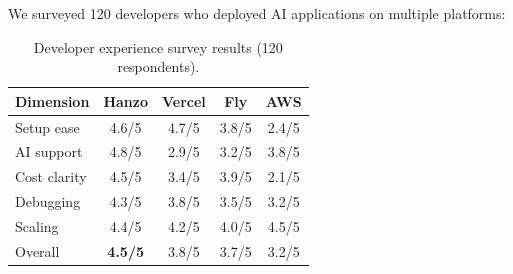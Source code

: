 We surveyed 120 developers who deployed AI applications on multiple platforms:

\begin{table}[H]
\centering
\small
\begin{tabular}{lcccc}
\toprule
\textbf{Dimension} & \textbf{Hanzo} & \textbf{Vercel} & \textbf{Fly} & \textbf{AWS} \\
\midrule
Setup ease & 4.6/5 & 4.7/5 & 3.8/5 & 2.4/5 \\
AI support & 4.8/5 & 2.9/5 & 3.2/5 & 3.8/5 \\
Cost clarity & 4.5/5 & 3.4/5 & 3.9/5 & 2.1/5 \\
Debugging & 4.3/5 & 3.8/5 & 3.5/5 & 3.2/5 \\
Scaling & 4.4/5 & 4.2/5 & 4.0/5 & 4.5/5 \\
Overall & \textbf{4.5/5} & 3.8/5 & 3.7/5 & 3.2/5 \\
\bottomrule
\end{tabular}
\caption{Developer experience survey results (120 respondents).}
\label{tab:dx_survey}
\end{table}

